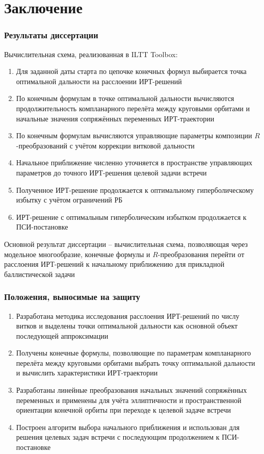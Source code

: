\section{Заключение}
\begin{frame}[t]
    \frametitle{Результаты диссертации}
    \presentationtextsize
    Вычислительная схема, реализованная в ILTT Toolbox:
    \begin{enumerate}
        \item Для заданной даты старта по цепочке конечных формул выбирается точка оптимальной дальности на расслоении ИРТ-решений
        \item По конечным формулам в точке оптимальной дальности вычисляются продолжительность компланарного перелёта между круговыми орбитами и начальные значения сопряжённых переменных ИРТ-траектории
        \item По конечным формулам вычисляются управляющие параметры композиции \(R\)-преобразований с учётом коррекции витковой дальности
        \item Начальное приближение численно уточняется в пространстве управляющих параметров до точного ИРТ-решения целевой задачи встречи
        \item Полученное ИРТ-решение продолжается к оптимальному гиперболическому избытку с учётом ограничений РБ
        \item ИРТ-решение с оптимальным гиперболическим избытком продолжается к ПСИ-постановке
    \end{enumerate}
    \vfill
    \begin{lowerbar}
        Основной результат диссертации -- вычислительная схема, позволяющая через модельное многообразие, конечные формулы и \(R\)-преобразования перейти от расслоения ИРТ-решений к начальному приближению для прикладной баллистической задачи
    \end{lowerbar}
\end{frame}
\begin{frame}
    \frametitle{Положения, выносимые на защиту}
    \presentationtextsize
    \begin{enumerate}
        \item Разработана методика исследования расслоения ИРТ-решений по числу витков и выделены точки оптимальной дальности как основной объект последующей аппроксимации
        \item Получены конечные формулы, позволяющие по параметрам компланарного перелёта между круговыми орбитами выбрать точку оптимальной дальности и вычислить характеристики ИРТ-траектории
        \item Разработаны линейные преобразования начальных значений сопряжённых переменных и применены для учёта эллиптичности и пространственной ориентации конечной орбиты при переходе к целевой задаче встречи
        \item Построен алгоритм выбора начального приближения и использован для решения целевых задач встречи с последующим продолжением к ПСИ-постановке
    \end{enumerate}
\end{frame}

